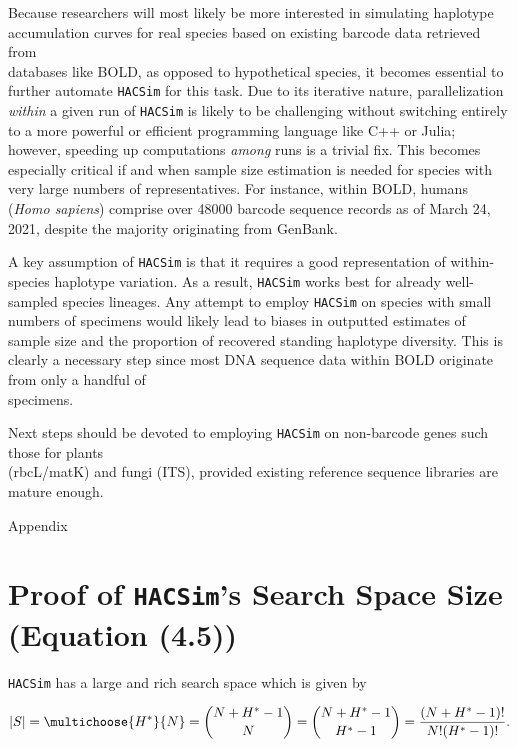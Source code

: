 Because researchers will most likely be more interested in simulating haplotype \\ accumulation curves for real species based on existing barcode data retrieved from \\ databases like BOLD, as opposed to hypothetical species, it becomes essential to further automate {\tt HACSim} for this task. Due to its iterative nature, parallelization \textit{within} a given run of {\tt HACSim} is likely to be challenging without switching entirely to a more powerful or efficient programming language like C++ or Julia; however, speeding up computations \textit{among} runs is a trivial fix. This becomes especially critical if and when sample size estimation is needed for species with very large numbers of representatives. For instance, within BOLD, humans (\textit{Homo sapiens}) comprise over 48000 barcode sequence records as of March 24, 2021, despite the majority originating from GenBank. 

A key assumption of {\tt HACSim} is that it requires a good representation of within-species haplotype variation. As a result, {\tt HACSim} works best for already well-sampled species lineages. Any attempt to employ {\tt HACSim} on species with small numbers of specimens would likely lead to biases in outputted estimates of sample size and the proportion of recovered standing haplotype diversity.  This is clearly a necessary step since most DNA sequence data within BOLD originate from only a handful of \\ specimens.


Next steps should be devoted to employing {\tt HACSim} on non-barcode genes such those for plants \\ (rbcL/matK) and fungi (ITS), provided existing reference sequence libraries are mature enough.


Appendix

\chapter{Proof of {\tt HACSim}'s Search Space Size (Equation (4.5))}

{\tt HACSim} has a large and rich search space which is given by

\begin{equation}
|S| = \multichoose{H^*}{N} = {{N + H^* - 1}\choose{N}} = {{N + H^* - 1}\choose{H^* - 1}} = \frac{(N + H^* - 1)!}{N!(H^* - 1)!}.
\end{equation}

